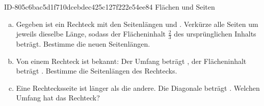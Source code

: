 \begin{exercise}
      {ID-805c6bac5d1f710dcebdec425c127f222e54ee84}
      {Flächen und Seiten}
  \ifproblem\problem\par
    \begin{enumerate}[a)]
      \item Gegeben ist ein Rechteck mit den Seitenlängen  und .
            Verkürze alle Seiten um jeweils dieselbe Länge, sodass der Flächeninhalt
            $\frac{2}{3}$ des ursprünglichen Inhalts beträgt. Bestimme die neuen
            Seitenlängen.
      \item Von einem Rechteck ist bekannt: Der Umfang beträgt , der
            Flächeninhalt beträgt . Bestimme die Seitenlängen des Rechtecks.
      \item Eine Rechtecksseite ist  länger als die andere. Die Diagonale
            beträgt . Welchen Umfang hat das Rechteck?
    \end{enumerate}
  \fi
\end{exercise}
